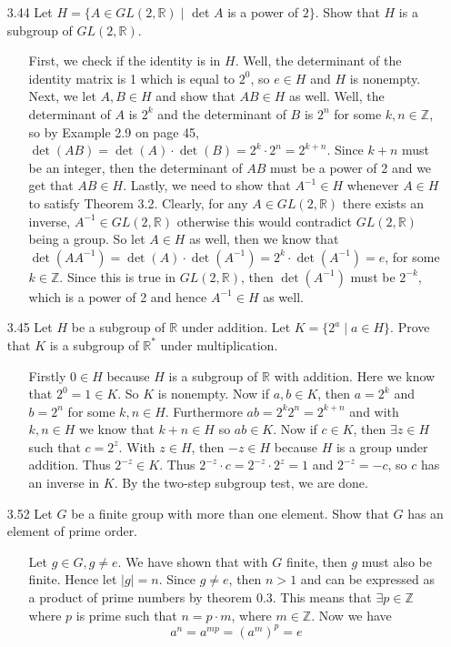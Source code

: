 \documentclass[12pt]{article}
\begin{document}
\begin{enumerate}
\item[3.44] Let $H = \{ A \in GL(2, \mathbb{R}) \mid $ det $A$ is a power of $2 \}$.
Show that $H$ is a subgroup of $GL(2, \mathbb{R})$.
\begin{enumerate}
\item[] First, we check if the identity is in $H$. Well, the determinant of the identity
matrix is 1 which is equal to $2^0$, so $e \in H$ and $H$ is nonempty. Next, we let
$A, B \in H$ and show that $AB \in H$ as well. Well, the determinant of $A$ is $2^k$ and
the determinant of $B$ is $2^n$ for some $k, n \in \mathbb{Z}$, so by Example 2.9 on page
45, $\det(AB) = \det(A) \cdot \det(B) = 2^k \cdot 2^n = 2^{k + n}$. Since $k + n$ must be
an integer, then the determinant of $AB$ must be a power of 2 and we get that $AB \in H$.
Lastly, we need to show that $A^{-1} \in H$ whenever $A \in H$ to satisfy Theorem 3.2.
Clearly, for any $A \in GL(2, \mathbb{R})$ there exists an inverse, 
$A^{-1} \in GL(2, \mathbb{R})$ otherwise this would contradict $GL(2, \mathbb{R})$ 
being a group. So let $A \in H$ as well, then we know that $\det(AA^{-1}) = 
\det(A) \cdot \det(A^{-1}) = 2^k \cdot \det(A^{-1}) = e$, for some $k \in \mathbb{Z}$.
Since this is true in $GL(2, \mathbb{R})$, then $\det(A^{-1})$ must be $2^{-k}$, which is a 
power of 2 and hence $A^{-1} \in H$ as well.
\end{enumerate}

\item[3.45] Let $H$ be a subgroup of $\mathbb{R}$ under addition. Let $K = \{ 2^a \mid a \in H
\}$. Prove that $K$ is a subgroup of $\mathbb{R}^*$ under multiplication.
\begin{enumerate}
\item[] Firstly $0 \in H$ because $H$ is a subgroup of $\mathbb{R}$ with addition. Here
we know that $2^0 = 1 \in K$. So $K$ is nonempty. Now if $a, b \in K$, then $a = 2^k$ and
$b = 2^n$ for some $k, n \in H$. Furthermore $ab = 2^k2^n = 2^{k + n}$ and with $
k, n \in H$ we know that $k + n \in H$ so $ab \in K$. Now if $c \in K$, then $\exists z
\in H$ such that $c = 2^z$. With $z \in H$, then $-z \in H$ because $H$ is a group under
addition. Thus $2^{-z} \in K$. Thus $2^{-z} \cdot c = 2^{-z} \cdot 2^z = 1$ and
$2^{-z} = -c$, so $c$ has an inverse in $K$. By the two-step subgroup test, we are done.
\end{enumerate}

\item[3.52] Let $G$ be a finite group with more than one element. Show that $G$ has an element of prime order.
\begin{enumerate}
\item[] Let $g \in G, g \neq e$. We have shown that with $G$ finite, then $g$ must also be finite.
Hence let $|g| = n$. Since $g \neq e$, then $n > 1$ and can be expressed as a product of prime
numbers by theorem 0.3. This means that $\exists p \in \mathbb{Z}$ where $p$ is prime such that
$n = p \cdot m$, where $m \in \mathbb{Z}$. Now we have
\[
a^n = a^{mp} = (a^m)^p = e
\]
\end{enumerate}



\end{enumerate}
\end{document}
